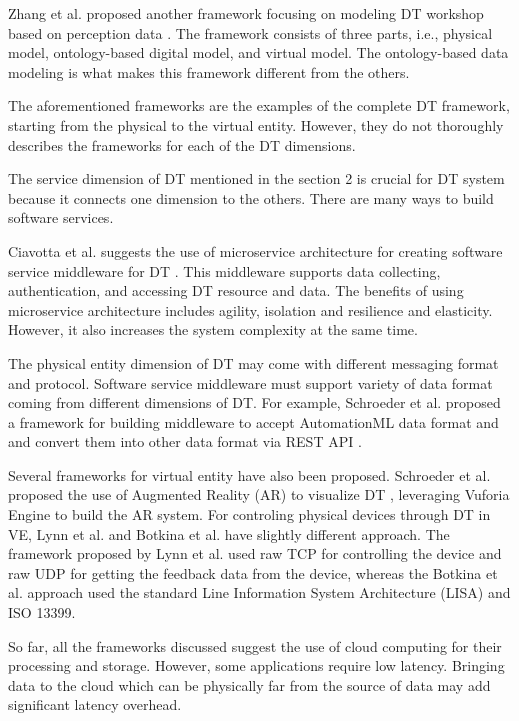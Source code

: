\documentclass[article,table]{aaltoseries}
\begin{document}
Zhang et al. proposed another framework focusing on modeling DT workshop based on perception data \cite{Zhang2017}. The framework consists of three parts, i.e., physical model, ontology-based digital model, and virtual model. The ontology-based data modeling is what makes this framework different from the others.

The aforementioned frameworks are the examples of the complete DT framework, starting from the physical to the virtual entity. However, they do not thoroughly describes the frameworks for each of the DT dimensions.

The service dimension of DT mentioned in the section 2 is crucial for DT system because it connects one dimension to the others. There are many ways to build software services.

Ciavotta et al. suggests the use of microservice architecture for creating software service middleware for DT \cite{ciavotta2017microservice}. This middleware supports data collecting, authentication, and accessing DT resource and data. The benefits of using microservice architecture includes agility, isolation and resilience and elasticity. However, it also increases the system complexity at the same time.

The physical entity dimension of DT may come with different messaging format and protocol. Software service middleware must support variety of data format coming from different dimensions of DT. For example, Schroeder et al. proposed a framework for building middleware to accept AutomationML data format and and convert them into other data format via REST API \cite{Schroeder2016automationml}.

Several frameworks for virtual entity have also been proposed. Schroeder et al. proposed the use of Augmented Reality (AR) to visualize DT \cite{schroeder2016visualising}, leveraging Vuforia Engine to build the AR system. For controling physical devices through DT in VE, Lynn et al. \cite{lynn2018realization} and Botkina et al. \cite{botkina2018digital} have slightly different approach. The framework proposed by Lynn et al. used raw TCP for controlling the device and raw UDP for getting the feedback data from the device, whereas the Botkina et al. approach used the standard Line Information System Architecture (LISA) and ISO 13399.

So far, all the frameworks discussed suggest the use of cloud computing for their processing and storage. However, some applications require low latency. Bringing data to the cloud which can be physically far from the source of data may add significant latency overhead.
\end{document}
